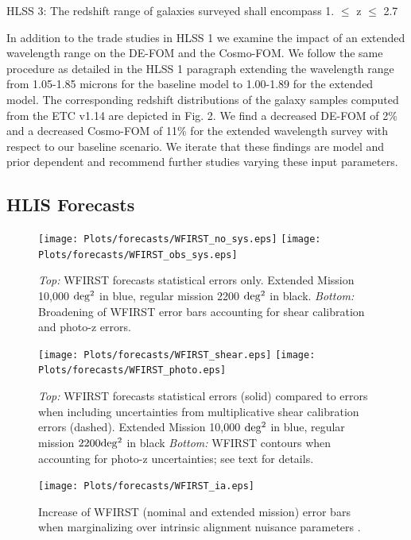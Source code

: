 HLSS 3: The redshift range of galaxies surveyed shall encompass 1. $\leq$ z $\leq$ 2.7 


In addition to the trade studies in HLSS 1 we examine the impact of an extended wavelength range on the DE-FOM and the Cosmo-FOM. We follow the same procedure as detailed in the HLSS 1 paragraph extending the wavelength range from 1.05-1.85 microns for the baseline model to 1.00-1.89 for the extended model. The corresponding redshift distributions of the galaxy samples computed from the ETC v1.14 are depicted in Fig. 2. We find a decreased DE-FOM of 2\% and a decreased Cosmo-FOM of 11\% for the extended wavelength survey with respect to our baseline scenario. We iterate that these findings are model and prior dependent and recommend further studies varying these input parameters.

\subsection{HLIS Forecasts}
\label{sec:HLISforecasts}
\begin{figure}
\texttt{[image: Plots/forecasts/WFIRST\_no\_sys.eps]}
\texttt{[image: Plots/forecasts/WFIRST\_obs\_sys.eps]}
\caption{\textit{Top:} WFIRST forecasts statistical errors only. Extended Mission 10,000 $\mathrm{deg^2}$ in blue, regular mission 2200 $\mathrm{deg^2}$ in black. \textit{Bottom:} Broadening of WFIRST error bars accounting for shear calibration and photo-z errors.}
         \label{fi:extended}
\end{figure}

\begin{figure}
\texttt{[image: Plots/forecasts/WFIRST\_shear.eps]}
\texttt{[image: Plots/forecasts/WFIRST\_photo.eps]}
\caption{\textit{Top:} WFIRST forecasts statistical errors (solid) compared to errors when including uncertainties from multiplicative shear calibration errors (dashed).  Extended Mission 10,000 $\mathrm{deg^2}$ in blue, regular mission $2200 \mathrm{deg^2}$ in black
\textit{Bottom:} WFIRST contours when accounting for photo-z uncertainties; see text for details.}
         \label{fi:sys_obs}
\end{figure}

\begin{figure}
\texttt{[image: Plots/forecasts/WFIRST\_ia.eps]}
\caption{Increase of WFIRST (nominal and extended mission) error bars when marginalizing over intrinsic alignment nuisance parameters \citep[see][for comparison]{keb16}.}
         \label{fi:IA}
\end{figure}

